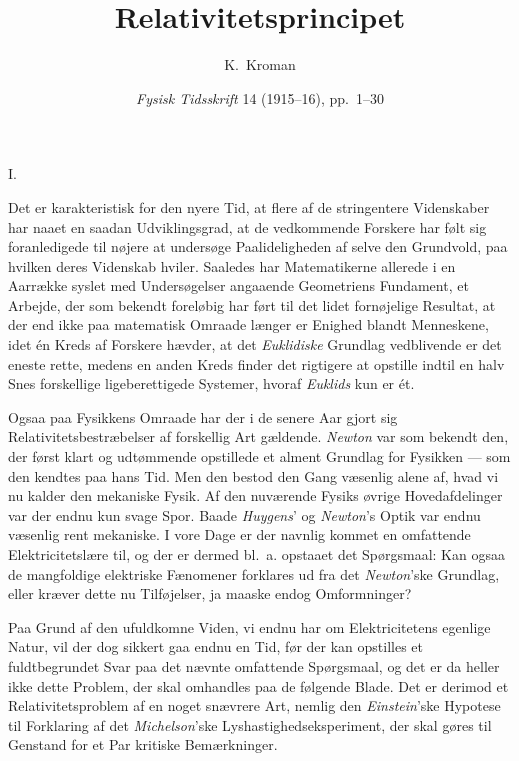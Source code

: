 \documentclass[12pt,a4paper]{article}
\title{\textbf{\guillemotright Relativitetsprincipet\guillemotleft}}
\author{K.\ Kroman}
\date{\textit{Fysisk Tidsskrift} 14 (1915--16), pp.~1--30}
\newcommand{\opage}[1]{\marginnote{\footnotesize\textit{[#1]}}}
\begin{document}
\maketitle

\opage{1} \begin{center}
I.
\end{center}

Det er karakteristisk for den nyere Tid, at flere af de stringentere
Videnskaber har naaet en saadan Udviklingsgrad, at de vedkommende Forskere
har følt sig foranledigede til nøjere at undersøge Paalideligheden af selve
den Grundvold, paa hvilken deres Videnskab hviler. Saaledes har Matematikerne
allerede i en Aarrække syslet med Undersøgelser angaaende Geometriens
Fundament, et Arbejde, der som bekendt foreløbig har ført til det lidet
fornøjelige Resultat, at der end ikke paa matematisk Omraade længer er Enighed
blandt Menneskene, idet én Kreds af Forskere hævder, at det \emph{Euklidiske}
Grundlag vedblivende er det eneste rette, medens en anden Kreds finder det
rigtigere at opstille indtil en halv Snes forskellige ligeberettigede
Systemer, hvoraf \emph{Euklids} kun er ét.

Ogsaa paa Fysikkens Omraade har der i de senere Aar gjort sig
Relativitetsbestræbelser af forskellig Art gældende. \emph{Newton} var som
bekendt den, der først klart og udtømmende opstillede et alment Grundlag for
Fysikken --- som den kendtes paa hans Tid. Men den bestod den Gang væsenlig
alene af, hvad vi nu kalder den mekaniske Fysik. Af den nuværende Fysiks
øvrige Hovedafdelinger var der endnu kun svage Spor. Baade \emph{Huygens}' og
\emph{Newton}'s Optik var endnu væsenlig rent mekaniske. I vore Dage er der
navnlig kommet en omfattende Elektricitetslære til, og der er dermed bl.\ a.
opstaaet det Spørgsmaal: Kan ogsaa de mangfoldige elektriske Fænomener
forklares ud fra det \emph{Newton}'ske Grundlag, eller kræver dette nu
Tilføjelser, ja maaske endog Omformninger?

\opage{2} Paa Grund af den ufuldkomne Viden, vi endnu har om Elektricitetens egenlige
Natur, vil der dog sikkert gaa endnu en Tid, før der kan opstilles et
fuldtbegrundet Svar paa det nævnte omfattende Spørgsmaal, og det er da heller
ikke dette Problem, der skal omhandles paa de følgende Blade. Det er derimod
et Relativitetsproblem af en noget snævrere Art, nemlig den
\emph{Einstein}'ske Hypotese til Forklaring af det \emph{Michelson}'ske
Lyshastighedseksperiment, der skal gøres til Genstand for et Par kritiske
Bemærkninger.
\end{document}
